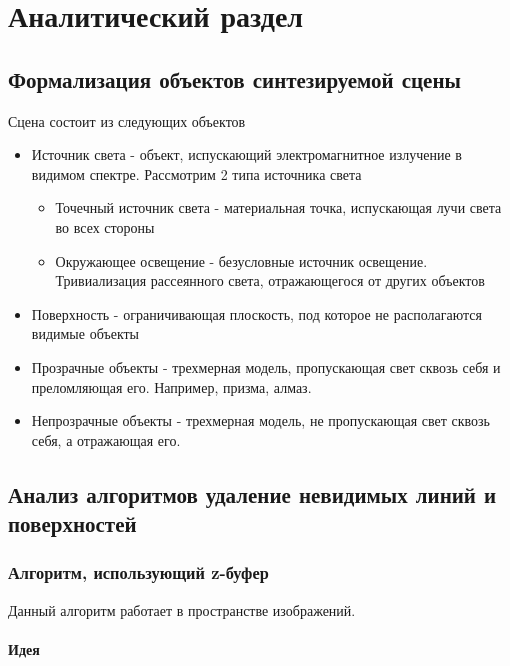 \chapter{Аналитический раздел}
\label{cha:analysis}

  \section{Формализация объектов синтезируемой сцены}
  
    Сцена состоит из следующих объектов
    
    \begin{itemize}
      \item Источник света - объект, испускающий электромагнитное излучение в видимом спектре. Рассмотрим 2 типа источника света
      \begin{itemize}
        \item Точечный источник света - материальная точка, испускающая лучи света во всех стороны
        \item Окружающее освещение - безусловные источник освещение. Тривиализация рассеянного света, отражающегося от других объектов
      \end{itemize}
      \item Поверхность - ограничивающая плоскость, под которое не располагаются видимые объекты
      \item Прозрачные объекты - трехмерная модель, пропускающая свет сквозь себя и преломляющая его. Например, призма, алмаз.
      \item Непрозрачные объекты - трехмерная модель, не пропускающая свет сквозь себя, а отражающая его.
    \end{itemize}


  \section{Анализ алгоритмов удаление невидимых линий и поверхностей}

    \subsection{Алгоритм, использующий z-буфер}
    
      Данный алгоритм работает в пространстве изображений.   
  
      \subsubsection{Идея}

